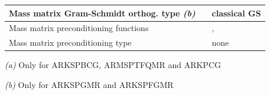 \documentclass[letterpaper,10pt,english]{sphinxmanual}
\begin{document}
\begin{tabulary}{\linewidth}{|L|L|L|}
Mass matrix Gram-Schmidt orthog. type \emph{(b)}
 & 
{\hyperref[c_interface/User_callable:ARKSpilsSetMassGSType]{}}
 & 
classical GS
\\\hline

Mass matrix preconditioning functions
 & 
{\hyperref[c_interface/User_callable:ARKSpilsSetMassPreconditioner]{}}
 & 
, 
\\\hline

Mass matrix preconditioning type
 & 
{\hyperref[c_interface/User_callable:ARKSpilsSetMassPrecType]{}}
 & 
none
\\\hline
\end{tabulary}


\emph{(a)} Only for ARKSPBCG, ARMSPTFQMR and ARKPCG

\emph{(b)} Only for ARKSPGMR and ARKSPFGMR
\end{document}
